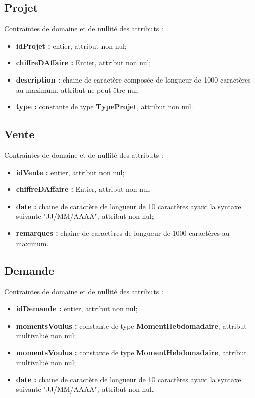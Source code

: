 \documentclass[asi, sansVersion]{picInsa}
\begin{document}
\subsection*{Projet}
Contraintes de domaine et de nullité des attributs :
\begin{itemize}
 	\item \textbf{idProjet :} entier, attribut non nul;
	\item \textbf{chiffreDAffaire :} Entier, attribut non nul;
	\item \textbf{description :} chaine de caractère composée de longueur de 1000 caractères au maximum, attribut ne peut être nul;
	\item \textbf{type :} constante de type \textbf{TypeProjet}, attribut non nul. \\  
\end{itemize} 

\subsection*{Vente}
Contraintes de domaine et de nullité des attributs :
\begin{itemize}
 	\item \textbf{idVente :} entier, attribut non nul;
	\item \textbf{chiffreDAffaire :} Entier, attribut non nul;
	\item \textbf{date :} chaine de caractère de longueur de 10 caractères ayant la syntaxe suivante "JJ/MM/AAAA", attribut non nul;
	\item \textbf{remarques :} chaine de caractères de longueur de 1000 caractères au maximum. \\  
\end{itemize} 

\subsection*{Demande}
Contraintes de domaine et de nullité des attributs :
\begin{itemize}
 	\item \textbf{idDemande :} entier, attribut non nul;
	\item \textbf{momentsVoulus :} constante de type \textbf{MomentHebdomadaire}, attribut multivalué non nul;
	\item \textbf{momentsVoulus :} constante de type \textbf{MomentHebdomadaire}, attribut multivalué non nul;
	\item \textbf{date :} chaine de caractère de longueur de 10 caractères ayant la syntaxe suivante "JJ/MM/AAAA", attribut non nul. \\
\end{itemize} 
\end{document}
